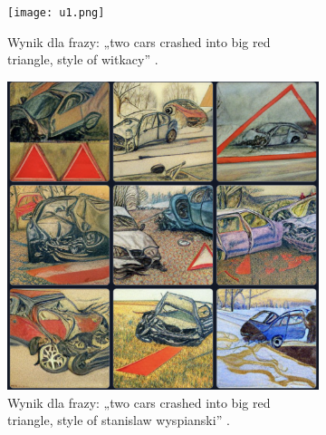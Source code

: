 \documentclass[12pt]{article}
\begin{document}
\begin{figure}[H]
     \centering
     \begin{subfigure}[H]{0.40\textwidth}
        \centering
        \texttt{[image: u1.png]}
        \caption{Wynik dla frazy: „two cars crashed into big red triangle, style of witkacy” \cite{6}.\\}
        \label{u1}
     \end{subfigure}
     \hfill
     \begin{subfigure}[H]{0.40\textwidth}
         \centering
         \includegraphics[width=\textwidth]{u2.png}
    \caption{Wynik dla frazy: „two cars crashed into big red triangle, style of stanislaw wyspianski” \cite{6}.\\}
    \label{u2}
     \end{subfigure}
     \centering
     \begin{subfigure}[H]{0.40\textwidth}
        \centering

\end{subfigure}
\end{figure}
\end{document}
